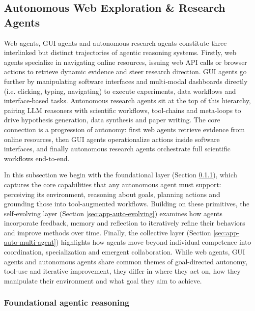 \subsection{Autonomous Web Exploration \& Research Agents}
\label{sec:app-research}

Web agents, GUI agents and autonomous research agents constitute three interlinked but distinct trajectories of agentic reasoning systems. Firstly, web agents specialize in navigating online resources, issuing web API calls or browser actions to retrieve dynamic evidence and steer research direction. GUI agents go further by manipulating software interfaces and multi-modal dashboards directly (i.e. clicking, typing, navigating) to execute experiments, data workflows and interface-based tasks. Autonomous research agents sit at the top of this hierarchy, pairing LLM reasoners with scientific workflows, tool-chains and meta-loops to drive hypothesis generation, data synthesis and paper writing. The core connection is a progression of autonomy: first web agents retrieve evidence from online resources, then GUI agents operationalize actions inside software interfaces, and finally autonomous research agents orchestrate full scientific workflows end-to-end.

In this subsection we begin with the foundational layer (Section \ref{sec:app-auto-foundational}), which captures the core capabilities that any autonomous agent must support: perceiving its environment, reasoning about goals, planning actions and grounding those into tool-augmented workflows. Building on these primitives, the self-evolving layer (Section \ref{sec:app-auto-evolving}) examines how agents incorporate feedback, memory and reflection to iteratively refine their behaviors and improve methods over time. Finally, the collective layer (Section \ref{sec:app-auto-multi-agent}) highlights how agents move beyond individual competence into coordination, specialization and emergent collaboration. While web agents, GUI agents and autonomous agents share common themes of goal-directed autonomy, tool-use and iterative improvement, they differ in where they act on, how they manipulate their environment and what goal they aim to achieve.



\subsubsection{Foundational agentic reasoning}


\label{sec:app-auto-foundational}


